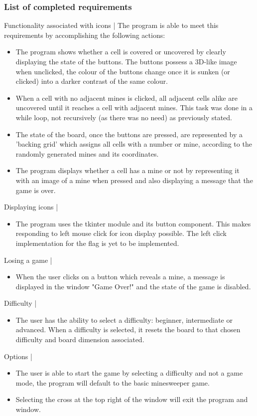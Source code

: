 \documentclass[12pt, a4]{report}
\begin{document}
		\subsubsection{List of completed requirements}
		Functionality associated with icons |
		The program is able to meet this requirements by accomplishing the following actions:
		\begin{itemize}
			\item The program shows whether a cell is covered or uncovered by clearly displaying the state of the buttons. The buttons possess a 3D-like image when unclicked, the colour of the buttons change once it is sunken (or clicked) into a darker contrast of the same colour. 
			\item When a cell with no adjacent mines is clicked, all adjacent cells alike are uncovered until it reaches a cell with adjacent mines. This task was done in a while loop, not recursively (as there was no need) as previously stated. 
			\item The state of the board, once the buttons are pressed, are represented by a 'backing grid' which assigns all cells with a number or mine, according to the randomly generated mines and its coordinates.
			\item The program displays whether a cell has a mine or not by representing it with an image of a mine when pressed and also displaying a message that the game is over.
		\end{itemize}
		\newline
		Displaying icons |
		\begin{itemize}
		\par
		\item The program uses the tkinter module and its button component. This makes responding to left mouse click for icon display possible. The left click implementation for the flag is yet to be implemented. 
		\end{itemize}
		Losing a game |
		\begin{itemize}
		\par 
		\item When the user clicks on a button which reveals a mine, a message is displayed in the window "Game Over!" and the state of the game is disabled. 
		\end{itemize}
		Difficulty |
		\begin{itemize}
		\par 
		\item The user has the ability to select a difficulty: beginner, intermediate or advanced. When a difficulty is 	selected, it resets the board to that chosen difficulty and board dimension associated. 
		\end{itemize}
		Options |
		\begin{itemize}
		\par 
		\item The user is able to start the game by selecting a difficulty and not a game mode, the program will default to the basic minesweeper game. 
		\item Selecting the cross at the top right of the window will exit the program and window. 
		\end{itemize}
\end{document}

